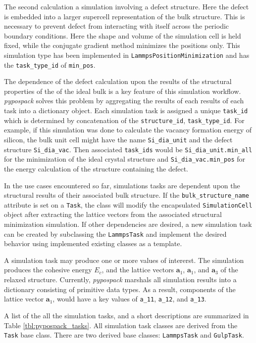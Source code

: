 The second calculation a simulation involving a defect structure.  Here the defect is embedded into a larger supercell representation of the bulk structure.  This is necessary to prevent defect from interacting with itself across the periodic boundary conditions.  Here the shape and volume of the simulation cell is held fixed, while the conjugate gradient method minimizes the positions only.  This simulation type has been implemented in \verb|LammpsPositionMinimization| and has the \verb|task_type_id| of \verb|min_pos|.

The dependence of the defect calculation upon the results of the  structural properties of the of the ideal bulk is a key feature of this simulation workflow.  \emph{pypospack} solves this problem by aggregating the results of each results of each task into a dictionary object.  Each simulation task is assigned a unique \verb|task_id| which is determined by concatenation of the \verb|structure_id|, \verb|task_type_id|.  For example, if this simulation was done to calculate the vacancy formation energy of silicon, the bulk unit cell might have the name \verb|Si_dia_unit| and the defect structure \verb|Si_dia_vac|.  Then associated \verb|task_ids| would be \verb|Si_dia_unit.min_all| for the minimization of the ideal crystal structure and \verb|Si_dia_vac.min_pos| for the energy calculation of the structure containing the defect.

In the use cases encountered so far, simulations tasks are dependent upon the structural results of their associated bulk structure.  If the \verb|bulk_structure_name| attribute is set on a \verb|Task|, the class will modify the encapsulated \verb|SimulationCell| object after extracting the lattice vectors from the associated structural minimization simulation.  If other dependencies are desired, a new simulation task can be created by subclassing the \verb|LammpsTask| and implement the desired behavior using implemented existing classes as a template.

A simulation task may produce one or more values of intererst.  The simulation produces the cohesive energy $E_c$, and the lattice vectors $\bm{a}_1$, $\bm{a}_1$, and $\bm{a}_3$ of the relaxed structure.  Currently, \emph{pypospack} marshals all simulation results into a dictionary consisting of primitive data types.  As a result, components of the lattice vector $\bm{a}_1$, would have a key values of \verb|a_11|, \verb|a_12|, and \verb|a_13|.

A list of the all the simulation tasks, and a short descriptions are summarized in Table \ref{tbl:pypospack_tasks}.  All simulation task classes are derived from the  \verb|Task| base class. There are two derived base classes: \verb|LammpsTask| and \verb|GulpTask|.

